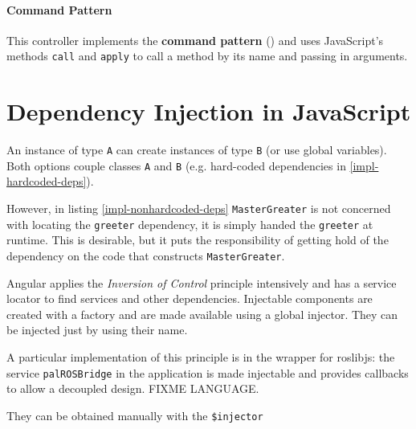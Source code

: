 \paragraph{Command Pattern} This controller implements the \textbf{command pattern} (\cite{Osmani:2012}) and uses JavaScript's methods \texttt{call} and \texttt{apply} to call a method by its name and passing in arguments.




\section{Dependency Injection in JavaScript}
An instance of type \texttt{A} can create instances of type \texttt{B} (or use global variables). 
Both options couple classes \texttt{A} and \texttt{B} (e.g. hard-coded dependencies in \ref{impl-hardcoded-deps}).





However, in listing \ref{impl-nonhardcoded-deps} \texttt{MasterGreater} is not concerned with locating the \texttt{greeter} dependency, it is simply handed the \texttt{greeter} at runtime.
This is desirable, but it puts the responsibility of getting hold of the dependency on the code that constructs \texttt{MasterGreater}.

Angular applies the \emph{Inversion of Control} principle intensively and has a service locator to find services and other dependencies.
Injectable components are created with a factory and are made available using a global injector.
They can be injected just by using their name.

A particular implementation of this principle is in the wrapper for roslibjs: the service \texttt{palROSBridge} in the application is made injectable and provides callbacks to allow a decoupled design. FIXME LANGUAGE.



They can be obtained manually with the \texttt{\$injector}


